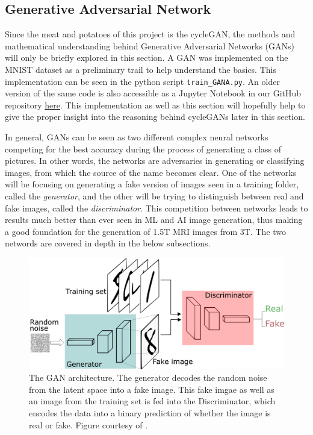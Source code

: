 \documentclass[12pt, fleqn, titlepage]{article}
\begin{document}
\subsection{Generative Adversarial Network}\label{gan}
Since the meat and potatoes of this project is the cycleGAN, the methods and mathematical understanding behind Generative Adversarial Networks (GANs) will only be briefly explored in this section. A GAN was implemented on the MNIST dataset as a preliminary trail to help understand the basics. This implementation can be seen in the python script \texttt{train\_GANA.py}. An older version of the same code is also accessible as a Jupyter Notebook in our GitHub repository  \href{https://github.com/oskarwiese/AlzPred/blob/main/preliminary/GAN_MNIST.ipynb}{here}. This implementation as well as this section will hopefully help to give the proper insight into the reasoning behind cycleGANs later in this section.

In general, GANs can be seen as two different complex neural networks competing for the best accuracy during  the process of generating a class of pictures. In other words, the networks are adversaries in generating or classifying images, from which the source of the name becomes clear. One of the networks will be focusing on generating a fake version of images seen in a training folder, called the \textit{generator}, and the other will be trying to distinguish between real and fake images, called the \textit{discriminator}. This competition between networks leads to results much better than ever seen in ML and AI image generation, thus making a good foundation for the generation of 1.5T MRI images from 3T. The two networds are covered in depth in the below subsections.
\begin{figure}[H]
	\centering
	\includegraphics[width=0.7\linewidth]{"imgs/GAN architecture"}
	\caption{The GAN architecture. The generator decodes the random noise from the latent space into a fake image. This fake imgae as well as an image from the training set is fed into the Discriminator, which encodes the data into a binary prediction of whether the image is real or fake. Figure courtesy of \cite{gan_introduction_towards_datascience}.}
	\label{fig:gan-architecture}
\end{figure}
\end{document}
